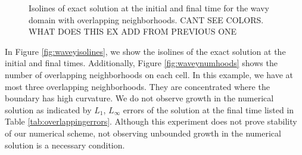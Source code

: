 \begin{figure}[h]
{}
\caption{Isolines of exact solution at the initial and final time for the
wavy domain with overlapping neighborhoods. CANT SEE COLORS. WHAT DOES
THIS EX ADD FROM PREVIOUS ONE} 
\end{figure}

In Figure \ref{fig:waveyisolines}, we show the isolines of the exact solution at the initial and final times.  Additionally, Figure \ref{fig:waveynumhoods} shows the number of overlapping neighborhoods on each cell.  In this example, we have at most three overlapping neighborhoods.  They are concentrated where the boundary has high curvature.   We do not observe growth in the numerical solution as indicated by $L_1$, $L_\infty$ errors of the solution at the final time listed in Table \ref{tab:overlappingerrors}.  Although this experiment does not prove stability of our numerical scheme, not observing unbounded growth in the numerical solution is a necessary condition.


